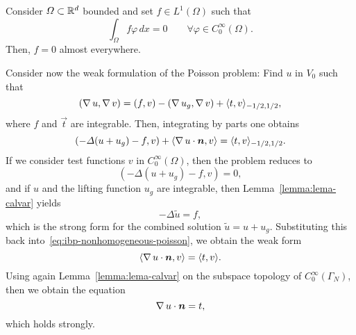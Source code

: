 \begin{lemma}\label{lemma:lema-calvar}
    Consider $\Omega\subset \mathbb{R}^d$ bounded and set $f\in L^1(\Omega)$ such that
    \begin{equation}\label{eq:lemma-calvar}
        \int_\Omega f\varphi\,dx = 0 \qquad \forall \varphi \in C_0^\infty(\Omega).
    \end{equation}
    Then, $f=0$ almost everywhere.
\end{lemma}

Consider now the weak formulation of the Poisson problem: Find $u$ in $V_0$ such that 
\begin{equation}
    (\operatorname{\nabla} u, \operatorname{\nabla} v) = (f, v) - (\operatorname{\nabla} u_g, \operatorname{\nabla} v) + \langle t, v\rangle_{-1/2, 1/2},
\end{equation}
where $f$ and $\vec t$ are integrable. Then, integrating by parts one obtains
\begin{equation}\label{eq:ibp-nonhomogeneous-poisson}
    (-\Delta (u+u_g) - f, v)+\langle \grad u \cdot \vec n, v\rangle = \langle t, v\rangle_{-1/2,1/2}.
\end{equation}
If we consider test functions $v$ in $C_0^\infty(\Omega)$, then the problem reduces to
\begin{equation}
    (-\Delta (u+u_g) - f, v) = 0,
\end{equation}
and if $u$ and the lifting function $u_g$ are integrable, then Lemma~\ref{lemma:lema-calvar} yields
\begin{equation*}
    -\Delta \tilde u = f,
\end{equation*}
which is the strong form for the combined solution $\tilde u= u + u_g$. Substituting this back into~\ref{eq:ibp-nonhomogeneous-poisson}, we obtain the weak form
\begin{equation*}
    \langle \grad u \cdot \vec n, v\rangle = \langle t, v\rangle.
\end{equation*}
Using again Lemma~\ref{lemma:lema-calvar} on the subspace topology of $C_0^\infty(\Gamma_N)$, then we obtain the equation
\begin{equation*}
    \grad u\cdot \vec n = t,
\end{equation*}
which holds strongly.\\


